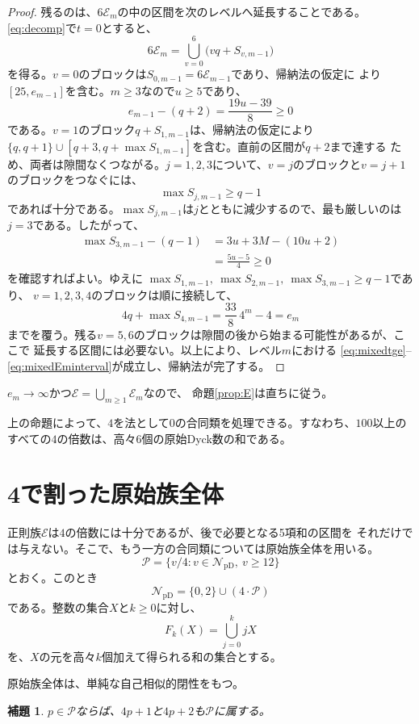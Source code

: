 \documentclass[12pt]{ltjsarticle}
\theoremstyle{plain}
\newtheorem{lemma}[theorem]{補題}
\newcommand{\NpD}{\mathcal{N}_{\mathrm{pD}}}
\newcommand{\Pset}{\mathcal P}
\begin{document}
\begin{proof}
残るのは、$6\mathcal E_m$の中の区間を次のレベルへ延長することである。
\eqref{eq:decomp}で$t=0$とすると、
\[
 6\mathcal E_m=\bigcup_{v=0}^{6}\bigl(vq+S_{v,m-1}\bigr)
\]
を得る。$v=0$のブロックは$S_{0,m-1}=6\mathcal E_{m-1}$であり、帰納法の仮定に
より$[25,e_{m-1}]$を含む。$m\geq3$なので$u\geq5$であり、
\[
 e_{m-1}-(q+2)=\frac{19u-39}{8}\geq0
\]
である。$v=1$のブロック$q+S_{1,m-1}$は、帰納法の仮定により
$\{q,q+1\}\cup[q+3,q+\max S_{1,m-1}]$を含む。直前の区間が$q+2$まで達する
ため、両者は隙間なくつながる。$j=1,2,3$について、$v=j$のブロックと$v=j+1$
のブロックをつなぐには、
\[
 \max S_{j,m-1}\geq q-1
\]
であれば十分である。$\max S_{j,m-1}$は$j$とともに減少するので、最も厳しいのは
$j=3$である。したがって、
\[
\begin{aligned}
 \max S_{3,m-1}-(q-1)
 &=3u+3M-(10u+2)\\
 &=\frac{5u-5}{4}\geq0
\end{aligned}
\]
を確認すればよい。ゆえに
$\max S_{1,m-1},\ \max S_{2,m-1},\ \max S_{3,m-1}\geq q-1$であり、
$v=1,2,3,4$のブロックは順に接続して、
\[
 4q+\max S_{4,m-1}=\frac{33}{8}\,4^m-4=e_m
\]
までを覆う。残る$v=5,6$のブロックは隙間の後から始まる可能性があるが、ここで
延長する区間には必要ない。以上により、レベル$m$における
\eqref{eq:mixedtge}--\eqref{eq:mixedEminterval}が成立し、帰納法が完了する。
\end{proof}

$e_m\to\infty$かつ$\mathcal E=\bigcup_{m\geq1}\mathcal E_m$なので、
命題\ref{prop:E}は直ちに従う。

上の命題によって、$4$を法として$0$の合同類を処理できる。すなわち、$100$以上の
すべての$4$の倍数は、高々6個の原始Dyck数の和である。

\section{4で割った原始族全体}

正則族$\mathcal E$は$4$の倍数には十分であるが、後で必要となる5項和の区間を
それだけでは与えない。そこで、もう一方の合同類については原始族全体を用いる。
\[
 \Pset=\{v/4:v\in\NpD,\ v\geq12\}
\]
とおく。このとき
\[
 \NpD=\{0,2\}\cup(4\cdot\Pset)
\]
である。整数の集合$X$と$k\geq0$に対し、
\[
 F_k(X)=\bigcup_{j=0}^{k}jX
\]
を、$X$の元を高々$k$個加えて得られる和の集合とする。

原始族全体は、単純な自己相似的閉性をもつ。

\begin{lemma}\label{lem:Pclosure}
$p\in\Pset$ならば、$4p+1$と$4p+2$も$\Pset$に属する。
\end{lemma}
\end{document}

